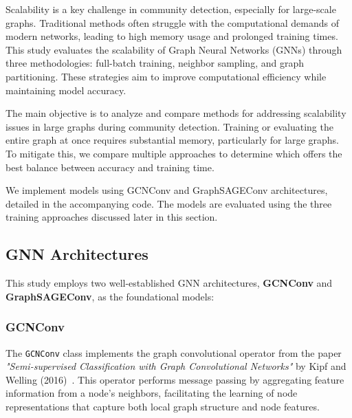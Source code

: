 \documentclass{article}
\begin{document}

Scalability is a key challenge in community detection, especially for large-scale graphs. Traditional methods often struggle with the computational demands of modern networks, leading to high memory usage and prolonged training times. This study evaluates the scalability of Graph Neural Networks (GNNs) through three methodologies: full-batch training, neighbor sampling, and graph partitioning. These strategies aim to improve computational efficiency while maintaining model accuracy.

The main objective is to analyze and compare methods for addressing scalability issues in large graphs during community detection. Training or evaluating the entire graph at once requires substantial memory, particularly for large graphs. To mitigate this, we compare multiple approaches to determine which offers the best balance between accuracy and training time.

We implement models using GCNConv and GraphSAGEConv architectures, detailed in the accompanying code. The models are evaluated using the three training approaches discussed later in this section.

\subsection{GNN Architectures}
This study employs two well-established GNN architectures, \textbf{GCNConv} and \textbf{GraphSAGEConv}, as the foundational models:

\subsubsection{GCNConv}
The \texttt{GCNConv} class implements the graph convolutional operator from the paper \emph{"Semi-supervised Classification with Graph Convolutional Networks"} by Kipf and Welling (2016)~\cite{kipf2017semisupervisedclassificationgraphconvolutional}. This operator performs message passing by aggregating feature information from a node's neighbors, facilitating the learning of node representations that capture both local graph structure and node features.
\end{document}

